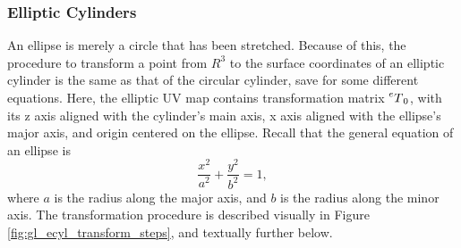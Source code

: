 \subsubsection{Elliptic Cylinders}
An ellipse is merely a circle that has been stretched.
Because of this, the procedure to transform a point from $R^3$ to the surface coordinates of an elliptic cylinder is the same as that of the circular cylinder, save for some different equations.
Here, the elliptic UV map contains transformation matrix $\prescript{e}{}T_0$, with its z axis aligned with the cylinder's main axis, x axis aligned with the ellipse's major axis, and origin centered on the ellipse.
Recall that the general equation of an ellipse is
\begin{equation*}
	\frac{x^2}{a^2} + \frac{y^2}{b^2} = 1,
\end{equation*}
where $a$ is the radius along the major axis, and $b$ is the radius along the minor axis.
The transformation procedure is described visually in Figure \ref{fig:gl_ecyl_transform_steps}, and textually further below.

